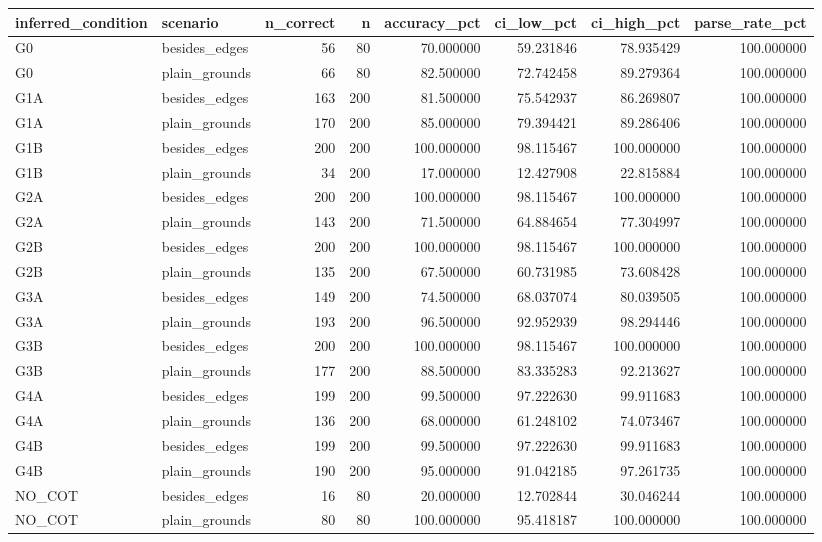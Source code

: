 \begin{tabular}{llrrrrrr}
\toprule
inferred_condition & scenario & n_correct & n & accuracy_pct & ci_low_pct & ci_high_pct & parse_rate_pct \\
\midrule
G0 & besides_edges & 56 & 80 & 70.000000 & 59.231846 & 78.935429 & 100.000000 \\
G0 & plain_grounds & 66 & 80 & 82.500000 & 72.742458 & 89.279364 & 100.000000 \\
G1A & besides_edges & 163 & 200 & 81.500000 & 75.542937 & 86.269807 & 100.000000 \\
G1A & plain_grounds & 170 & 200 & 85.000000 & 79.394421 & 89.286406 & 100.000000 \\
G1B & besides_edges & 200 & 200 & 100.000000 & 98.115467 & 100.000000 & 100.000000 \\
G1B & plain_grounds & 34 & 200 & 17.000000 & 12.427908 & 22.815884 & 100.000000 \\
G2A & besides_edges & 200 & 200 & 100.000000 & 98.115467 & 100.000000 & 100.000000 \\
G2A & plain_grounds & 143 & 200 & 71.500000 & 64.884654 & 77.304997 & 100.000000 \\
G2B & besides_edges & 200 & 200 & 100.000000 & 98.115467 & 100.000000 & 100.000000 \\
G2B & plain_grounds & 135 & 200 & 67.500000 & 60.731985 & 73.608428 & 100.000000 \\
G3A & besides_edges & 149 & 200 & 74.500000 & 68.037074 & 80.039505 & 100.000000 \\
G3A & plain_grounds & 193 & 200 & 96.500000 & 92.952939 & 98.294446 & 100.000000 \\
G3B & besides_edges & 200 & 200 & 100.000000 & 98.115467 & 100.000000 & 100.000000 \\
G3B & plain_grounds & 177 & 200 & 88.500000 & 83.335283 & 92.213627 & 100.000000 \\
G4A & besides_edges & 199 & 200 & 99.500000 & 97.222630 & 99.911683 & 100.000000 \\
G4A & plain_grounds & 136 & 200 & 68.000000 & 61.248102 & 74.073467 & 100.000000 \\
G4B & besides_edges & 199 & 200 & 99.500000 & 97.222630 & 99.911683 & 100.000000 \\
G4B & plain_grounds & 190 & 200 & 95.000000 & 91.042185 & 97.261735 & 100.000000 \\
NO_COT & besides_edges & 16 & 80 & 20.000000 & 12.702844 & 30.046244 & 100.000000 \\
NO_COT & plain_grounds & 80 & 80 & 100.000000 & 95.418187 & 100.000000 & 100.000000 \\
\bottomrule
\end{tabular}
